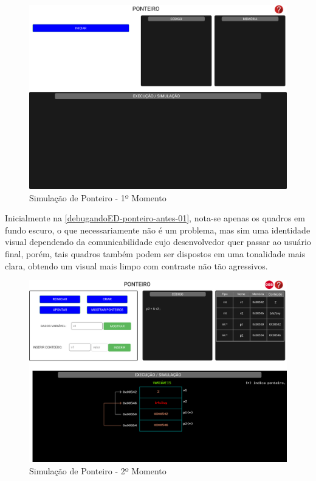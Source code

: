 \begin{figure}[htb]
    \begin{center}
	    \includegraphics[scale=0.25]{figs/debugandoED-ponteiro-antes-01.png}
	\end{center}
    \caption{\label{debugandoED-ponteiro-antes-01}Simulação de Ponteiro - 1º Momento}
\end{figure}

Inicialmente na \autoref{debugandoED-ponteiro-antes-01}, nota-se apenas os quadros em fundo escuro, o que necessariamente não é um problema, mas sim uma identidade visual dependendo da comunicabilidade cujo desenvolvedor quer passar ao usuário final, porém, tais quadros também podem ser dispostos em uma tonalidade mais clara, obtendo um visual mais limpo com contraste não tão agressivos.

\begin{figure}[htb]
    \begin{center}
	    \includegraphics[scale=0.25]{figs/debugandoED-ponteiro-antes-02.png}
	\end{center}
    \caption{\label{debugandoED-ponteiro-antes-02}Simulação de Ponteiro - 2º Momento}
\end{figure}


